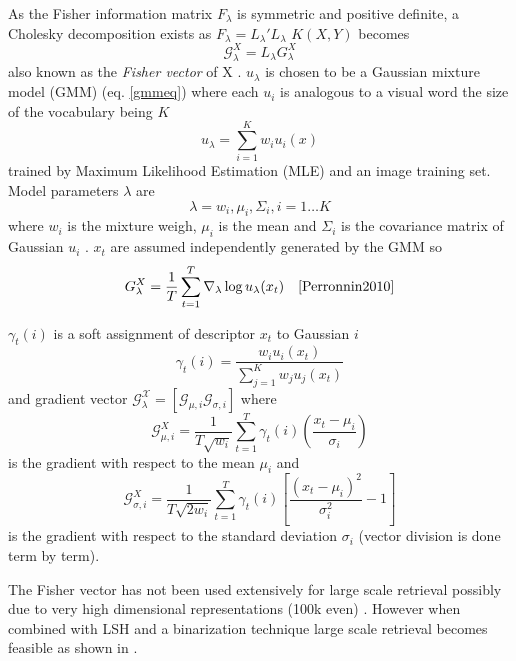 \documentclass[english,12pt,a4paper,pdftex,elec,utf8, table]{aaltothesis}
\begin{document}
As the Fisher information matrix $F_\lambda$ is symmetric and positive definite, a Cholesky decomposition exists as $F_\lambda = L_\lambda'L_\lambda$ $K(X,Y)$ becomes
\begin{equation}\label{fishervectorfinal}
\mathcal{G}_\lambda^X = L_\lambda G_\lambda^X
\end{equation}
also known as the \emph{Fisher vector} of X \cite{Perronnin2010}. $u_\lambda$ is chosen to be a Gaussian mixture model (GMM) (eq. \ref{gmmeq}) where each $u_i$ is analogous to a visual word the size of the vocabulary being $K$ \cite{Perronnin2010a}
\begin{equation}\label{gmmeq}
u_\lambda = \sum_{i=1}^K w_iu_i(x)
\end{equation}
trained by Maximum Likelihood Estimation (MLE) and an image training set. Model parameters $\lambda$ are
\begin{equation}\label{lambdaparams}
\lambda = {w_i,\mu_i, \Sigma_i, i=1 \ldots K}
\end{equation}
where $w_i$ is the mixture weigh, $\mu_i$ is the mean and $\Sigma_i$ is the covariance matrix of Gaussian $u_i$ \cite{Perronnin2010}. $x_t$ are assumed independently generated by the GMM so
\begin{equation}\label{gmm}
G_\lambda^X = \frac{1}{T}\sum_{t=1}^T \nabla_\lambda \log u_\lambda(x_t) \quad \cite{Perronnin2010}
\end{equation}

$\gamma_t(i)$ is a soft assignment of descriptor $x_t$ to Gaussian $i$
\begin{equation} \label{descriptortogaussian}
\gamma_t(i) = \frac{w_iu_i(x_t)}{\sum_{j=1}^Kw_ju_j(x_t)}
\end{equation}
and gradient vector $\mathcal{G_\lambda^X} = [\mathcal{G}_{\mu,i} \mathcal{G}_{\sigma,i}] $ where
\begin{equation}\label{fishervectormu}
\mathcal{G}_{\mu,i}^X = \frac{1}{T\sqrt{w_i}} \sum^T_{t=1} \gamma_t(i)\left(\frac{x_t - \mu_i}{\sigma_i}\right)
\end{equation}
is the gradient with respect to the mean $\mu_i$ and
\begin{equation}\label{fishervectorsigma}
\mathcal{G}_{\sigma,i}^X = \frac{1}{T\sqrt{2w_i}} \sum_{t=1}^T \gamma_t(i)\left[\frac{(x_t - \mu_i)^2}{\sigma_i^2} -1\right]
  \end{equation}
is the gradient with respect to the standard deviation $\sigma_i$ (vector division is done term by term). \cite{Perronnin2010}

The Fisher vector has not been used extensively for large scale retrieval possibly due to very high dimensional representations (100k even) \cite{Perronnin2010a}. However when combined with LSH and a binarization technique large scale retrieval becomes feasible as shown in \cite{Perronnin2010a}.
\end{document}
